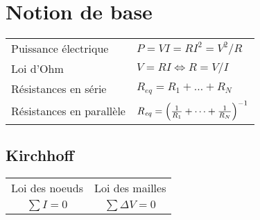 \section{Notion de base}
\vspace{-1.75\baselineskip}
\begin{tabular}{ll}
Puissance électrique & \(P = VI = R I^2 = V^2/R\)\\
Loi d'Ohm & \(V = RI \Leftrightarrow R=V/I \)\\
Résistances en série & \(R_{\mathit{eq}}=R_1 + \dots + R_N\)\\
Résistances en parallèle & \(R_{\mathit{eq}}=\qty(\frac{1}{R_1}+\dots +\frac{1}{R_N})^{-1}\)
\end{tabular}

\subsection{Kirchhoff}
\begin{center}
\begin{tabular}{c|c}
    Loi des noeuds & Loi des mailles \\
    $\sum I = 0$ & $\sum \Delta V =0$
\end{tabular}
\end{center}




